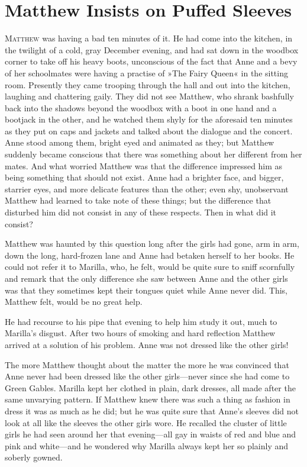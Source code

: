 \chapter{Matthew Insists on Puffed Sleeves}

\lettrine[lines=4]{M}{atthew} was having a bad ten minutes of it. He had come into the kitchen, in the twilight of a cold, gray December evening, and had sat down in the woodbox corner to take off his heavy boots, unconscious of the fact that Anne and a bevy of her schoolmates were having a practise of »The Fairy Queen« in the sitting room. Presently they came trooping through the hall and out into the kitchen, laughing and chattering gaily. They did not see Matthew, who shrank bashfully back into the shadows beyond the woodbox with a boot in one hand and a bootjack in the other, and he watched them shyly for the aforesaid ten minutes as they put on caps and jackets and talked about the dialogue and the concert. Anne stood among them, bright eyed and animated as they; but Matthew suddenly became conscious that there was something about her different from her mates. And what worried Matthew was that the difference impressed him as being something that should not exist. Anne had a brighter face, and bigger, starrier eyes, and more delicate features than the other; even shy, unobservant Matthew had learned to take note of these things; but the difference that disturbed him did not consist in any of these respects. Then in what did it consist?

Matthew was haunted by this question long after the girls had gone, arm in arm, down the long, hard-frozen lane and Anne had betaken herself to her books. He could not refer it to Marilla, who, he felt, would be quite sure to sniff scornfully and remark that the only difference she saw between Anne and the other girls was that they sometimes kept their tongues quiet while Anne never did. This, Matthew felt, would be no great help.

He had recourse to his pipe that evening to help him study it out, much to Marilla's disgust. After two hours of smoking and hard reflection Matthew arrived at a solution of his problem. Anne was not dressed like the other girls!

The more Matthew thought about the matter the more he was convinced that Anne never had been dressed like the other girls—never since she had come to Green Gables. Marilla kept her clothed in plain, dark dresses, all made after the same unvarying pattern. If Matthew knew there was such a thing as fashion in dress it was as much as he did; but he was quite sure that Anne's sleeves did not look at all like the sleeves the other girls wore. He recalled the cluster of little girls he had seen around her that evening—all gay in waists of red and blue and pink and white—and he wondered why Marilla always kept her so plainly and soberly gowned.


